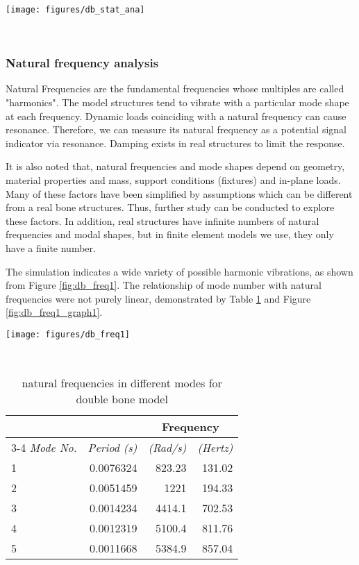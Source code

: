 \documentclass{sigchi}
\begin{document}
\begin{figure*}
\centering
  \texttt{[image: figures/db\_stat\_ana]}
  \caption{the static stress analysis of the double bone model in (a) stress, (b) displacement and (c) strain.}~\label{fig:db_stat_ana}
\end{figure*}


\subsubsection{Natural frequency analysis}

Natural Frequencies are the fundamental frequencies whose multiples are called "harmonics". The model structures tend to vibrate with a particular mode shape at each frequency. Dynamic loads coinciding with a natural frequency can cause resonance. Therefore, we can measure its natural frequency as a potential signal indicator via resonance. Damping exists in real structures to limit the response.

It is also noted that, natural frequencies and mode shapes depend on geometry, material properties and mass, support conditions (fixtures) and in-plane loads. Many of these factors have been simplified by assumptions which can be different from a real bone structures. Thus, further study can be conducted to explore these factors. In addition, real structures have infinite numbers of natural frequencies and modal shapes, but in finite element models we use, they only have a finite number.

The simulation indicates a wide variety of possible harmonic vibrations, as shown from Figure \ref{fig:db_freq1}. The relationship of mode number with natural frequencies were not purely linear, demonstrated by Table \ref{tab:db_freq} and Figure \ref{fig:db_freq1_graph1}.

\begin{figure*}
  \centering
  \texttt{[image: figures/db\_freq1]}
  \caption{natural frequency analysis for double bone}
    ~\label{fig:db_freq1}
\end{figure*}

\begin{table}
  \centering
  \begin{tabular}{l r r r}
    & & \multicolumn{2}{c}{\small{\textbf{Frequency}}} \\
    \cmidrule(r){3-4}
    {\small\textit{Mode No.}}
    & {\small \textit{Period (s)}}
      & {\small \textit{(Rad/s)}}
    & {\small \textit{(Hertz)}} \\
    \midrule
    1 & 0.0076324 & 823.23 & 131.02 \\
    2 & 0.0051459 & 1221 & 194.33 \\
    3 & 0.0014234 & 4414.1 & 702.53 \\
    4 & 0.0012319 & 5100.4 & 811.76 \\
    5 & 0.0011668 & 5384.9 & 857.04 \\
  \end{tabular}
  \caption{natural frequencies in different modes for double bone model}~\label{tab:db_freq}
\end{table}
\end{document}
